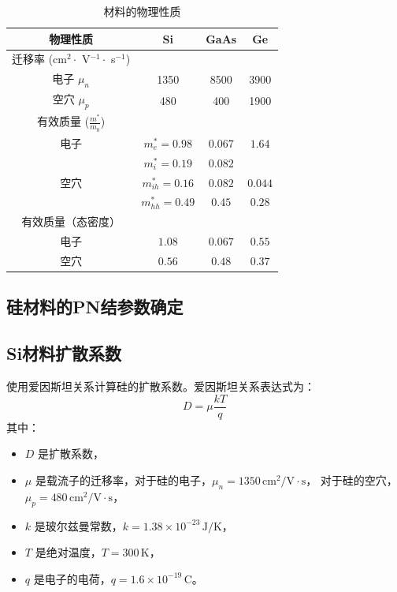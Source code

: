 \documentclass[12pt,hyperref,a4paper,UTF8]{ctexart}
\begin{document}
\begin{table}[H]
\centering
\begin{tabular}{|c|c|c|c|}
\hline
物理性质 & Si & GaAs & Ge \\ \hline
迁移率 (cm$^2 \cdot$ V$^{-1} \cdot$ s$^{-1}$) & & & \\ \hline
电子 $\mu_n$ & 1350 & 8500 & 3900 \\ \hline
空穴 $\mu_p$ & 480 & 400 & 1900 \\ \hline
有效质量 ($\frac{m^*}{m_0}$) & & & \\ \hline
电子 & $m_e^* = 0.98$ & $0.067$ & $1.64$ \\ \hline
 & $m_i^* = 0.19$ & $0.082$ & \\ \hline
空穴 & $m_{ih}^* = 0.16$ & $0.082$ & $0.044$ \\ \hline
 & $m_{hh}^* = 0.49$ & $0.45$ & $0.28$ \\ \hline
有效质量（态密度） & & & \\ \hline
电子 & $1.08$ & $0.067$ & $0.55$ \\ \hline
空穴 & $0.56$ & $0.48$ & $0.37$ \\ \hline
\end{tabular}
\caption{材料的物理性质}
\end{table}
\newpage

\subsection{硅材料的PN结参数确定}
\subsection*{Si材料扩散系数}

使用爱因斯坦关系计算硅的扩散系数。爱因斯坦关系表达式为：
\[ D = \mu \frac{kT}{q} \]
其中：
\begin{itemize}
    \item \( D \) 是扩散系数，
    \item \( \mu \) 是载流子的迁移率，对于硅的电子，\( \mu_n = 1350 \, \text{cm}^2/\text{V}\cdot\text{s} \)， 对于硅的空穴，\( \mu_p = 480 \, \text{cm}^2/\text{V}\cdot\text{s} \)，
    \item \( k \) 是玻尔兹曼常数，\( k = 1.38 \times 10^{-23} \, \text{J/K} \)，
    \item \( T \) 是绝对温度，\( T = 300 \, \text{K} \)，
    \item \( q \) 是电子的电荷，\( q = 1.6 \times 10^{-19} \, \text{C} \)。
\end{itemize}
\end{document}
